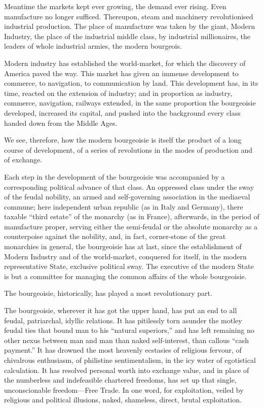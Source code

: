 Meantime the markets kept ever growing, the demand ever rising. Even
manufacture no longer sufficed. Thereupon, steam and machinery
revolutionised industrial production. The place of manufacture was
taken by the giant, Modern Industry, the place of the industrial middle
class, by industrial millionaires, the leaders of whole industrial
armies, the modern bourgeois.

Modern industry has established the world-market, for which the
discovery of America paved the way. This market has given an immense
development to commerce, to navigation, to communication by land. This
development has, in its time, reacted on the extension of industry; and
in proportion as industry, commerce, navigation, railways extended, in
the same proportion the bourgeoisie developed, increased its capital,
and pushed into the background every class handed down from the Middle
Ages.

We see, therefore, how the modern bourgeoisie is itself the product of
a long course of development, of a series of revolutions in the modes
of production and of exchange.

Each step in the development of the bourgeoisie was accompanied by a
corresponding political advance of that class. An oppressed class under
the sway of the feudal nobility, an armed and self-governing
association in the mediaeval commune; here independent urban republic
(as in Italy and Germany), there taxable \enquote{third estate} of the monarchy
(as in France), afterwards, in the period of manufacture proper,
serving either the semi-feudal or the absolute monarchy as a
counterpoise against the nobility, and, in fact, corner-stone of the
great monarchies in general, the bourgeoisie has at last, since the
establishment of Modern Industry and of the world-market, conquered for
itself, in the modern representative State, exclusive political sway.
The executive of the modern State is but a committee for managing the
common affairs of the whole bourgeoisie.

The bourgeoisie, historically, has played a most revolutionary part.

The bourgeoisie, wherever it has got the upper hand, has put an end to
all feudal, patriarchal, idyllic relations. It has pitilessly torn
asunder the motley feudal ties that bound man to his \enquote{natural
superiors,} and has left remaining no other nexus between man and man
than naked self-interest, than callous \enquote{cash payment.} It has drowned
the most heavenly ecstasies of religious fervour, of chivalrous
enthusiasm, of philistine sentimentalism, in the icy water of
egotistical calculation. It has resolved personal worth into exchange
value, and in place of the numberless and indefeasible chartered
freedoms, has set up that single, unconscionable freedom—Free Trade. In
one word, for exploitation, veiled by religious and political
illusions, naked, shameless, direct, brutal exploitation.

